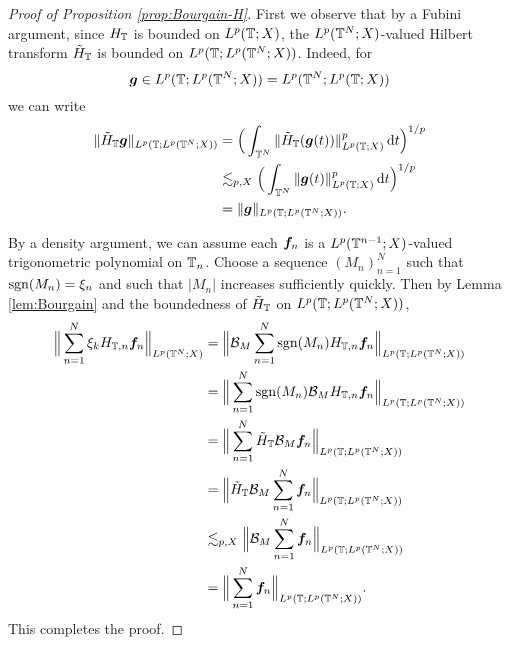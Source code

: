 \begin{proof}[Proof of Proposition \ref{prop:Bourgain-H}]
  First we observe that by a Fubini argument, since $H_{\mathbb{T}}$ is bounded on $L^p(\mathbb{T};X)$, the $L^p(\mathbb{T}^{N};X)$-valued Hilbert transform $\tilde{H}_{\mathbb{T}}$ is bounded on $L^p(\mathbb{T};L^p(\mathbb{T}^{N};X))$.
  Indeed, for
  \begin{equation*}
    \bm{g} \in L^p(\mathbb{T}; L^p(\mathbb{T}^{N};X)) = L^p(\mathbb{T}^{N};L^p(\mathbb{T};X))
  \end{equation*}
  we can write
  \begin{equation*}
    \begin{aligned}
      \|\tilde{H}_{\mathbb{T}} \bm{g}\|_{L^p(\mathbb{T};L^p(\mathbb{T}^{N};X))}
      &= \Big( \int_{\mathbb{T}^{N}} \|\tilde{H}_{\mathbb{T}} (\bm{g}(t))\|_{L^p(\mathbb{T};X)}^{p} \, \mathrm{d} t \Big)^{1/p} \\
      &\lesssim_{p,X} \Big( \int_{\mathbb{T}^{N}} \| \bm{g}(t)\|_{L^p(\mathbb{T};X)}^{p} \, \mathrm{d} t \Big)^{1/p} \\
      &= \|\bm{g}\|_{L^p(\mathbb{T};L^p(\mathbb{T}^{N};X))}.
  \end{aligned}
  \end{equation*}

  
  By a density argument, we can assume each $\bm{f}_{n}$ is a $L^p(\mathbb{T}^{n-1};X)$-valued trigonometric polynomial on $\mathbb{T}_{n}$.
  Choose a sequence $(M_{n})_{n=1}^{N}$ such that $\operatorname{sgn}(M_n) = \xi_{n}$ and such that $|M_n|$ increases sufficiently quickly.
  Then by Lemma \ref{lem:Bourgain} and the boundedness of $\tilde{H}_{\mathbb{T}}$ on $L^p(\mathbb{T};L^p(\mathbb{T}^{N};X))$,
  \begin{equation*}
    \begin{aligned}
      \Big\| \sum_{n=1}^{N} \xi_{k} H_{\mathbb{T},n} \bm{f}_{n} \Big\|_{L^p(\mathbb{T}^{N};X)}
      &= \Big\| \mathcal{B}_{M} \sum_{n=1}^{N} \operatorname{sgn}(M_n) H_{\mathbb{T},n} \bm{f}_{n} \Big\|_{L^p(\mathbb{T};L^p(\mathbb{T}^{N};X))} \\
      &= \Big\| \sum_{n=1}^{N} \operatorname{sgn}(M_n) \mathcal{B}_{M} H_{\mathbb{T},n} \bm{f}_{n} \Big\|_{L^p(\mathbb{T};L^p(\mathbb{T}^{N};X))} \\
      &= \Big\| \sum_{n=1}^{N} \tilde{H}_{\mathbb{T}} \mathcal{B}_{M} \bm{f}_{n} \Big\|_{L^p(\mathbb{T};L^p(\mathbb{T}^{N};X))} \\
      &=  \Big\| \tilde{H}_{\mathbb{T}} \mathcal{B}_{M}\sum_{n=1}^{N} \bm{f}_{n} \Big\|_{L^p(\mathbb{T};L^p(\mathbb{T}^{N};X))} \\
      &\lesssim_{p,X} \Big\| \mathcal{B}_{M} \sum_{n=1}^{N} \bm{f}_{n} \Big\|_{L^p(\mathbb{T};L^p(\mathbb{T}^{N};X))} \\
      &= \Big\| \sum_{n=1}^{N} \bm{f}_{n} \Big\|_{L^p(\mathbb{T};L^p(\mathbb{T}^{N};X))}.
    \end{aligned}
  \end{equation*}
  This completes the proof.
\end{proof}






